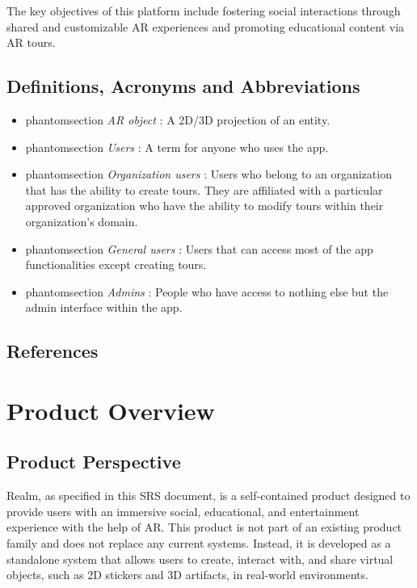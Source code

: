 \documentclass{article}
\makeatletter
\newcommand{\labeltext}[3][]{%
    \@bsphack%
    \csname phantomsection\endcsname%
    \def\tst{#1}%
    \def\labelmarkup{\emph}%
    \def\refmarkup{}%
    \ifx\tst\empty\def\@currentlabel{\refmarkup{#2}}{\label{#3}}%
    \else\def\@currentlabel{\refmarkup{#1}}{\label{#3}}\fi%
    \@esphack%
    \labelmarkup{#2}%
}
\makeatother
\begin{document}
The key objectives of this platform include fostering social interactions through shared and customizable AR experiences and promoting educational content via AR tours.

\subsection{Definitions, Acronyms and Abbreviations}
\label{sub:def_acr_abb}

\begin{itemize}
    \item \labeltext{AR object}{def:ar_obj}: A 2D/3D projection of an entity.
    \item \labeltext{Users}{def:user}: A term for anyone who uses the app.
    \item \labeltext{Organization users}{def:org_user}: Users who belong to an organization that has the ability to create tours. They are affiliated with a particular approved organization who have the ability to modify tours within their organization’s domain.
    \item \labeltext{General users}{def:gen_user}: Users that can access most of the app functionalities except creating tours.
    \item \labeltext{Admins}{def:admin}: People who have access to nothing else but the admin interface within the app.
\end{itemize}

\subsection{References}
\label{sub:references}

\begingroup
\raggedright

\endgroup


\section{Product Overview}

\subsection{Product Perspective}

Realm, as specified in this SRS document, is a self-contained product designed to provide users with an immersive social, educational, and entertainment experience with the help of AR. This product is not part of an existing product family and does not replace any current systems. Instead, it is developed as a standalone system that allows users to create, interact with, and share virtual objects, such as 2D stickers and 3D artifacts, in real-world environments.\\
\end{document}
